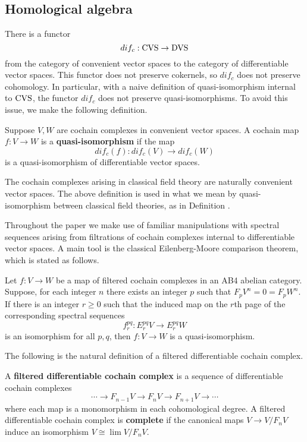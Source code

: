 \documentclass[10pt, oneside]{article}
\begin{document}
\subsection{Homological algebra}

There is a functor
\[
dif_c : {\rm CVS} \to {\rm DVS} 
\]
from the category of convenient vector spaces to the category of differentiable vector spaces. 
This functor does not preserve cokernels, so $dif_c$ does not preserve cohomology. 
In particular, with a naive definition of quasi-isomorphism internal to ${\rm CVS}$, the functor $dif_c$ does not preserve quasi-isomorphisms. 
To avoid this issue, we make the following definition. 

\begin{definition}
Suppose $V,W$ are cochain complexes in convenient vector spaces. 
A cochain map $f : V \to W$ is a {\bf quasi-isomorphism} if the map
\[
dif_c (f) : dif_c(V) \to dif_c(W)
\]
is a quasi-isomorphism of differentiable vector spaces.
\end{definition}

The cochain complexes arising in classical field theory are naturally convenient vector spaces. 
The above definition is used in what we mean by quasi-isomorphism between classical field theories, as in Definition .

Throughout the paper we make use of familiar manipulations with spectral sequences arising from filtrations of cochain complexes internal to differentiable vector spaces. 
A main tool is the classical Eilenberg-Moore comparison theorem, which is stated as follows.

\begin{thm}
Let $f : V \to W$ be a map of filtered cochain complexes in an AB4 abelian category.
Suppose, for each integer $n$ there exists an integer $p$ such that $F_p V^n = 0 = F_p W^n$.
If there is an integer $r \geq 0$ such that the induced map on the $r$th page of the corresponding spectral sequences 
\[
f_r^{pq} :  E_r^{pq} V \to E_r^{pq} W
\]
is an isomorphism for all $p,q$, then $f : V \to W$ is a quasi-isomorphism. 
\end{thm}

The following is the natural definition of a filtered differentiable cochain complex. 

\begin{definition}
A {\bf filtered differentiable cochain complex} is a sequence of differentiable cochain complexes
\[
\cdots \to F_{n-1} V \to F_{n} V \to F_{n+1}V \to \cdots
\]
where each map is a monomorphism in each cohomological degree. 
A filtered differentiable cochain complex is {\bf complete} if the canonical maps $V \to V / F_n V$ induce an isomorphism $V \cong \lim V / F_n V$. 
\end{definition}
\end{document}
